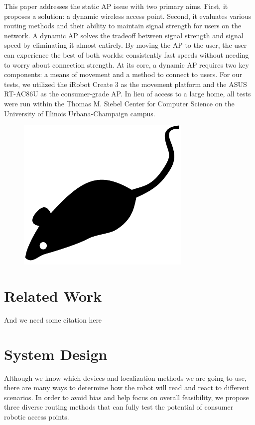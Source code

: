 This paper addresses the static AP issue with two primary aims. First, it proposes a solution: a dynamic wireless access point. Second, it evaluates various routing methods and their ability to maintain signal strength for users on the network. A dynamic AP solves the tradeoff between signal strength and signal speed by eliminating it almost entirely. By moving the AP to the user, the user can experience the best of both worlds: consistently fast speeds without needing to worry about connection strength. At its core, a dynamic AP requires two key components: a means of movement and a method to connect to users. For our tests, we utilized the iRobot Create 3 as the movement platform and the ASUS RT-AC86U as the consumer-grade AP. In lieu of access to a large home, all tests were run within the Thomas M. Siebel Center for Computer Science on the University of Illinois Urbana-Champaign campus. 


\begin{figure}[tp]
\centering
\includegraphics{figures/mouse}
\caption{\blindtext}
\end{figure}

\section{Related Work}
\blindtext

And we need some citation here\cite{floyd1993random, stoica2001chord}

\Blindtext

\section{System Design}
Although we know which devices and localization methods we are going to use, there are many ways to determine how the robot will read and react to different scenarios. In order to avoid bias and help focus on overall feasibility, we propose three diverse routing methods that can fully test the potential of consumer robotic access points.

